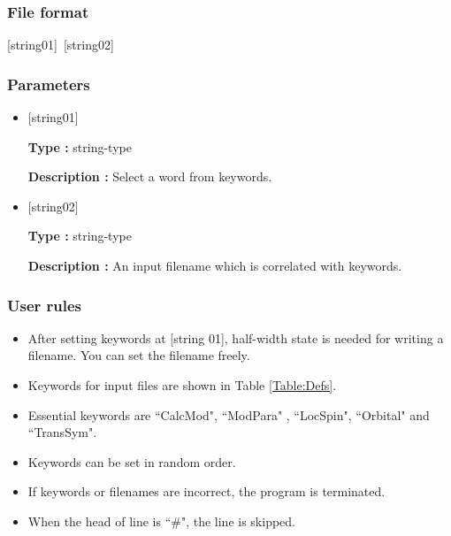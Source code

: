\subsubsection{File format}
[string01]~[string02]
\subsubsection{Parameters}
 \begin{itemize}
   \item  $[$string01$]$
   
   {\bf Type :} string-type
   
   {\bf Description :} Select a word from keywords.
   
   \item  $[$string02$]$
   
    {\bf Type :} string-type 

   {\bf Description :} An input filename which is correlated with keywords.
 \end{itemize}
\subsubsection{User rules}
\begin{itemize}
\item  After setting keywords at [string 01], half-width state is needed for writing a filename. You can set the filename freely.
\item Keywords for input files are shown in Table \ref{Table:Defs}.
\item Essential keywords are ``CalcMod", ``ModPara" , ``LocSpin", ``Orbital" and ``TransSym".
\item Keywords can be set in random order.
\item If keywords or filenames are incorrect, the program is terminated. 
\item When the head of line is ``$\#$", the line is skipped.
\end{itemize}

